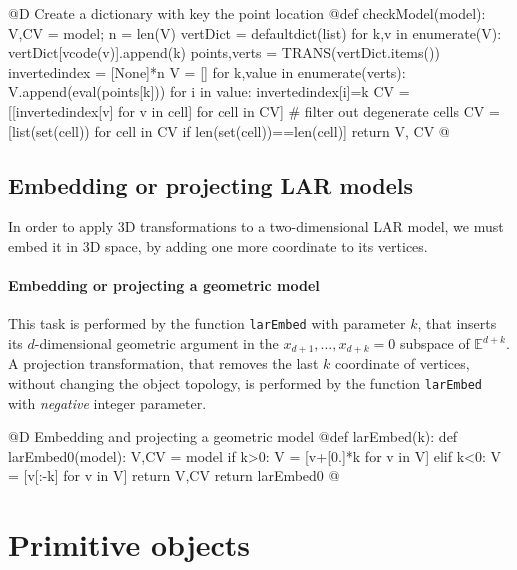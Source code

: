 \documentclass[11pt,oneside]{article}	%
\def\E{\mathbb{E}}
\begin{document}
@D Create a dictionary with key the point location
@{def checkModel(model):
	V,CV = model; n = len(V)
	vertDict = defaultdict(list)
	for k,v in enumerate(V): vertDict[vcode(v)].append(k) 
	points,verts = TRANS(vertDict.items())
	invertedindex = [None]*n
	V = []
	for k,value in enumerate(verts):
		V.append(eval(points[k]))
		for i in value:
			invertedindex[i]=k	
	CV = [[invertedindex[v] for v in cell] for cell in CV]
	# filter out degenerate cells
	CV = [list(set(cell)) for cell in CV if len(set(cell))==len(cell)]
	return V, CV
@}

\subsection{Embedding or projecting LAR models}

In order to apply 3D transformations to a two-dimensional LAR model, we must embed it in 3D space, by adding one more coordinate to its vertices. 

\paragraph{Embedding or projecting a geometric model}

This task is performed by the function \texttt{larEmbed} with parameter $k$, that inserts its $d$-dimensional geometric argument in the $x_{d+1}, \ldots, x_{d+k}=0$ subspace of $\E^{d+k}$.
A projection transformation, that removes the last $k$ coordinate of vertices, without changing the object topology, is performed by the function \texttt{larEmbed} with \emph{negative} integer parameter.


@D Embedding and projecting a geometric model
@{def larEmbed(k):
	def larEmbed0(model):
		V,CV = model
		if k>0:
			V = [v+[0.]*k for v in V] 
		elif k<0:
			V = [v[:-k] for v in V] 
		return V,CV
	return larEmbed0
@}


\section{Primitive objects}
\label{sec:generators}
\end{document}
